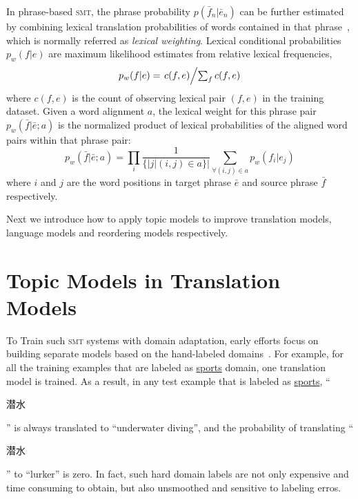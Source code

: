 In phrase-based \textsc{smt}, the phrase probability $p(\bar{f}_n | \bar{e}_n)$ can be further estimated by combining lexical translation probabilities of words contained in that phrase~\citep{koehn-03}, which is normally referred as \textit{lexical weighting}. Lexical conditional probabilities $p_w(f|e)$ are maximum likelihood estimates from relative lexical frequencies,
\begin{equation}
\label{eq:lexical_prob}
p_w(f|e) = \textstyle \left.c(f, e)\middle/\sum_f{c(f, e)}\right.
\end{equation}
where $c(f, e)$ is the count of observing lexical pair $(f, e)$ in the training dataset. Given a word alignment $a$, the lexical weight for this phrase pair $p_w(\bar{f} | \bar{e}; a)$ is the normalized product of lexical probabilities of the aligned word pairs within that phrase pair:
\begin{equation}
\label{eq:phrase_prob}
p_w(\bar{f} | \bar{e}; a) = \prod_{i} \frac{1}{\{|j | (i, j) \in a\}|} \sum_{\forall (i,j) \in a} p_w(f_i | e_j)
\end{equation}
where $i$ and $j$ are the word positions in target phrase $\bar{e}$ and source phrase $\bar{f}$ respectively.

Next we introduce how to apply topic models to improve translation models, language models and reordering models respectively.


\section{Topic Models in Translation Models}

To Train such \textsc{smt} systems with domain adaptation, early efforts focus on building separate models based on the hand-labeled domains~\citep{foster-07,matsoukas-09,chiang-11}. For example, for all the training examples that are labeled as \underline{sports} domain, one translation model is trained. As a result, in any test example that is labeled as \underline{sports}, ``\begin{CJK*}{UTF8}{gbsn}潜水\end{CJK*}'' is always translated to ``underwater diving'', and the probability of translating ``\begin{CJK*}{UTF8}{gbsn}潜水\end{CJK*}'' to ``lurker'' is zero. In fact, such hard domain labels are not only expensive and time consuming to obtain, but also unsmoothed and sensitive to labeling erros. 

